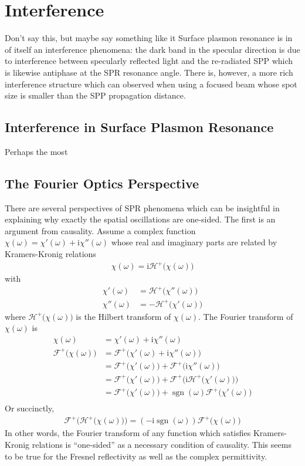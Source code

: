 \documentclass[a4paper,titlepage,onecolumn]{report}
\DeclareMathOperator{\sgn}{sgn}
\newcommand{\mi}{{\mathrm{i}}}
\newcommand{\ff}[1]{{\mathscr{F}^{+}\bigl(#1\bigr)}}
\newcommand{\hf}[1]{{\mathscr{H}^{+}\bigl(#1\bigr)}}
\begin{document}
\chapter{Interference}
Don't say this, but maybe say something like it
Surface plasmon resonance is in of itself an interference phenomena: the dark band in the specular direction is due to interference between
specularly reflected light and the re-radiated SPP which is likewise
antiphase at the SPR resonance angle.  There is, however, a more rich 
interference structure which can observed when using a focused beam whose spot size is smaller than the SPP propagation distance.  

\section{Interference in Surface Plasmon Resonance}
Perhaps the most 

\section{The Fourier Optics Perspective}
There are several perspectives of SPR phenomena which can be insightful in
explaining why exactly the spatial oscillations are one-sided.  The first
is an argument from causality.  Assume a complex function $\chi(\omega) =
\chi'(\omega) + \mi \chi''(\omega)$ whose real and imaginary parts are
related by Kramers-Kronig relations
\begin{align}
\chi(\omega)=\mi \hf{\chi(\omega)}
\end{align}
with 
\begin{align}
\chi'(\omega) &= \hf{\chi''(\omega)}\\
\chi''(\omega) &= -\hf{\chi'(\omega)}
\end{align}
where $\hf{\chi(\omega)}$ is the Hilbert transform of $\chi(\omega)$.
The Fourier transform of $\chi(\omega)$ is
\begin{align}
\chi(\omega) &= \chi'(\omega) + \mi \chi''(\omega)\\
\ff{\chi(\omega)} &= \ff{\chi'(\omega) + \mi \chi''(\omega)}\\
&= \ff{\chi'(\omega)} + \ff{\mi \chi''(\omega)}\\
&= \ff{\chi'(\omega)} + \ff{\mi \hf{\chi'(\omega)}} \\
&= \ff{\chi'(\omega)} + \sgn(\omega) \ff{\chi'(\omega)} \\
\end{align}
Or succinctly,
\begin{align}
\ff{\hf{\chi(\omega)}} = (-\mi \sgn(\omega)) \ff{\chi(\omega)}
\end{align}
In other words, the Fourier transform of any function which satisfies
Kramers-Kronig relations is ``one-sided'' as a necessary
condition of causality.  This seems to be true for the Fresnel
reflectivity as well as the complex permittivity.
\end{document}
